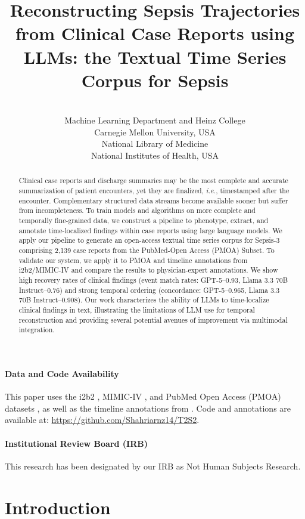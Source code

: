 \documentclass[pmlr,twocolumn,10pt]{jmlr} %
\title[Reconstructing Sepsis Trajectories from Clinical Case Reports]{Reconstructing Sepsis Trajectories from Clinical Case Reports using LLMs: the Textual Time Series Corpus for Sepsis}
\author{%
\Name{Shahriar Noroozizadeh} \Email{snoroozi@cmu.edu}\\
\addr Machine Learning Department and Heinz College\\
Carnegie Mellon University, USA 
\AND
\Name{Jeremy C. Weiss} \Email{jeremy.weiss@nih.gov}\\
\addr National Library of Medicine\\ 
National Institutes of Health, USA 
\vspace{-2.5em}
}
\begin{document}
\maketitle

\begin{abstract}
Clinical case reports and discharge summaries may be the most complete and accurate summarization of patient encounters, yet they are finalized, \emph{i.e.}, timestamped after the encounter.
Complementary structured data streams become available sooner but suffer from incompleteness.
To train models and algorithms on more complete and temporally fine-grained data, we construct a pipeline to phenotype, extract, and annotate time-localized findings within case reports using large language models.
We apply our pipeline to generate an open-access textual time series corpus for Sepsis-3 comprising 2,139 case reports from the PubMed-Open Access (PMOA) Subset.
To validate our system, we apply it to PMOA and timeline annotations from i2b2/MIMIC-IV and compare the results to physician-expert annotations.
We show high recovery rates of clinical findings (event match rates: GPT-5--0.93, Llama 3.3 70B Instruct--0.76) and strong temporal ordering (concordance: GPT-5--0.965, Llama 3.3 70B Instruct--0.908). 
Our work characterizes the ability of LLMs to time-localize clinical findings in text, illustrating the limitations of LLM use for temporal reconstruction and providing several potential avenues of improvement via multimodal integration.
\end{abstract}

\vspace{-0.2em}
\paragraph*{Data and Code Availability}
This paper uses the i2b2 \citep{sun2013evaluating}, MIMIC-IV \citep{johnson2023mimic}, and PubMed Open Access (PMOA) datasets \citep{pmc2024open}, as well as the timeline annotations from \cite{frattallone2024using}.
Code and annotations are available at: \url{https://github.com/Shahriarnz14/T2S2}.

\paragraph*{Institutional Review Board (IRB)}
This research has been designated by our IRB as Not Human Subjects Research.

\section{Introduction}
\label{sec:intro}
\end{document}
